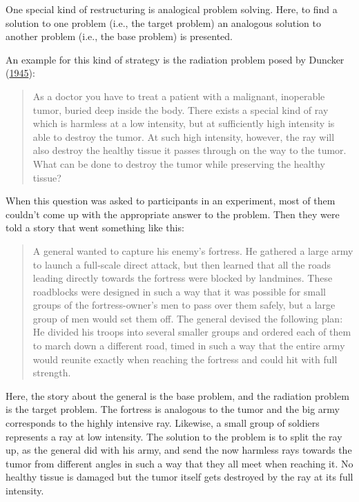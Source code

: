\documentclass[
]{krantz}
\begin{document}
One special kind of restructuring is analogical problem solving. Here, to find a solution to one problem (i.e., the target problem) an analogous solution to another problem (i.e., the base problem) is presented.

An example for this kind of strategy is the radiation problem posed by Duncker (\protect\hyperlink{ref-duncker1945problem}{1945}):

\begin{quote}
As a doctor you have to treat a patient with a malignant, inoperable tumor, buried deep inside the body. There exists a special kind of ray which is harmless at a low intensity, but at sufficiently high intensity is able to destroy the tumor. At such high intensity, however, the ray will also destroy the healthy tissue it passes through on the way to the tumor. What can be done to destroy the tumor while preserving the healthy tissue?
\end{quote}

When this question was asked to participants in an experiment, most of them couldn't come up with the appropriate answer to the problem. Then they were told a story that went something like this:

\begin{quote}
A general wanted to capture his enemy's fortress. He gathered a large army to launch a full-scale direct attack, but then learned that all the roads leading directly towards the fortress were blocked by landmines. These roadblocks were designed in such a way that it was possible for small groups of the fortress-owner's men to pass over them safely, but a large group of men would set them off. The general devised the following plan: He divided his troops into several smaller groups and ordered each of them to march down a different road, timed in such a way that the entire army would reunite exactly when reaching the fortress and could hit with full strength.
\end{quote}

Here, the story about the general is the base problem, and the radiation problem is the target problem. The fortress is analogous to the tumor and the big army corresponds to the highly intensive ray. Likewise, a small group of soldiers represents a ray at low intensity. The solution to the problem is to split the ray up, as the general did with his army, and send the now harmless rays towards the tumor from different angles in such a way that they all meet when reaching it. No healthy tissue is damaged but the tumor itself gets destroyed by the ray at its full intensity.
\end{document}
